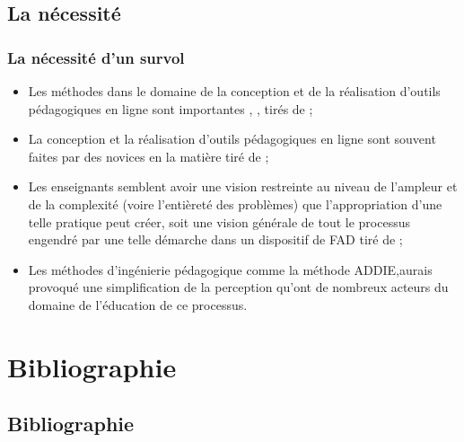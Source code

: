\subsection{La nécessité} 
		\begin{frame}[allowframebreaks]
			\frametitle{La nécessité d’un survol}
                        
                        \begin{itemize} 
                        \item  Les méthodes dans le domaine de la conception et de la réalisation d’outils pédagogiques en ligne sont importantes \citep[p. 842]{bohl2002a}, \citep[p. 218]{barry2003a}, \citep[p. 1]{hadjerrouit2007a} tirés de \cite{bonneau2013a};
                        \item La conception et la réalisation d’outils pédagogiques en ligne sont souvent faites par des novices en la matière \citep[p. 351]{verstegen2008a} tiré de \citet{bonneau2013a};
                        \item Les enseignants semblent avoir une vision restreinte au niveau de l’ampleur et de la complexité (voire l’entièreté des problèmes) que l’appropriation d’une telle pratique peut créer, soit une vision générale de tout le processus engendré par une telle démarche dans un dispositif de FAD \citep[p. 105]{roy2011a} tiré de \citet{bonneau2013a}; 
                        \item Les méthodes d’ingénierie pédagogique comme la méthode ADDIE,aurais provoqué une simplification de la perception qu’ont de nombreux acteurs du domaine de l’éducation de ce processus\citep[p.28]{bonneau2013a}. 

                        \end{itemize}

             
                \end{frame}


\section{Bibliographie}
\subsection{Bibliographie}



